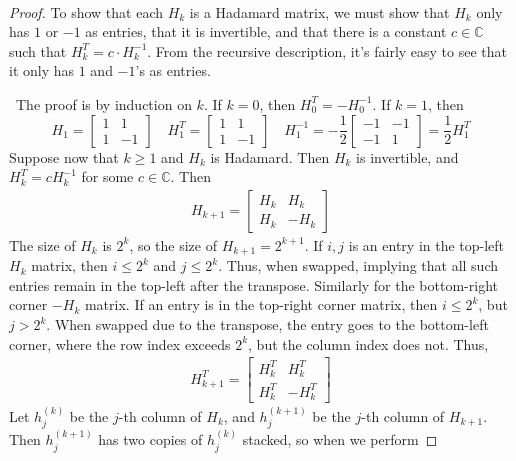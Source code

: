 \documentclass[12pt]{article}
\newenvironment{sol}[1][Solution]{\begin{trivlist}
		\item[\hskip \labelsep {\bfseries #1:}]}{\end{trivlist}}
\begin{document}
\begin{sol}
	\
	\begin{proof}
		To show that each $H_k$ is a Hadamard matrix, we must show that $H_k$ only has $1$
		or $-1$ as entries, that it is invertible, and that there is a constant $c\in \mathbb{C}$ such
		that $H_k^T = c\cdot H_k^{-1}$. From the recursive description, it's fairly easy to see that
		it only has $1$ and $-1$'s as entries.
		
		\
		The proof is by induction on $k$. If $k=0$, then $H_0^T=-H_0^{-1}$. If $k=1$, then
		\[
		H_1 = \begin{bmatrix}
			1 & 1\\
			1 & -1
		\end{bmatrix}
		\quad
		H_1^T = \begin{bmatrix}
			1 & 1\\
			1 & -1
		\end{bmatrix}
		\quad
		H_1^{-1}= -\frac{1}{2} \begin{bmatrix}
			-1 & -1\\
			-1 & 1
		\end{bmatrix}
		=\frac{1}{2}H_1^T
		\]
		Suppose now that $k\geq 1$ and $H_k$ is Hadamard. Then $H_k$ is invertible, and $H_k^T = cH_k^{-1}$
		for some $c\in\mathbb{C}$. Then
		\begin{align*}
			H_{k+1} = \begin{bmatrix}
				H_k & H_k\\
				H_k & -H_k
			\end{bmatrix}
		\end{align*}
		The size of $H_k$ is $2^k$, so the size of $H_{k+1}=2^{k+1}$. If $i,j$ is an entry in the
		top-left $H_k$ matrix, then $i\leq 2^k$ and $j\leq 2^k$. Thus, when swapped, implying that all
		such entries remain in the top-left after the transpose. Similarly for the bottom-right corner
		$-H_k$ matrix. If an entry is in the top-right corner matrix, then $i\leq 2^k$, but $j>2^k$.
		When swapped due to the transpose, the entry goes to the bottom-left corner, where the row
		index exceeds $2^k$, but the column index does not. Thus,
		\begin{align*}
			H_{k+1}^T = \begin{bmatrix}
				H_k^T & H_k^T\\
				H_k^T & -H_k^T
			\end{bmatrix}
		\end{align*}
		Let $h^{(k)}_j$ be the $j$-th column of $H_k$, and $h^{(k+1)}_j$ be the $j$-th column of
		$H_{k+1}$. Then $h^{(k+1)}_j$ has two copies of $h^{(k)}_j$ stacked, so when we perform

\end{proof}
\end{sol}
\end{document}
